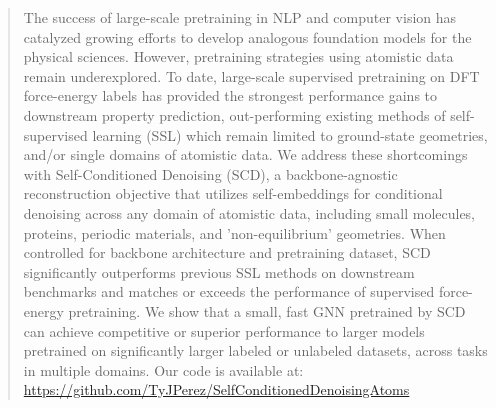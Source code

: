 \documentclass{article}
\theoremstyle{plain}
\theoremstyle{definition}
\theoremstyle{remark}
\begin{document}


\printAffiliationsAndNotice{}  %


\begin{abstract}
  

The success of large-scale pretraining in NLP and computer vision has catalyzed growing efforts to develop analogous foundation models for the physical sciences. However,  pretraining strategies using atomistic data remain underexplored. To date, large-scale supervised pretraining on DFT force-energy labels has provided the strongest performance gains to downstream property prediction, out-performing existing methods of self-supervised learning (SSL) which remain limited to ground-state geometries, and/or single domains of atomistic data. We address these shortcomings with Self-Conditioned Denoising (SCD), a backbone-agnostic reconstruction objective that utilizes self-embeddings for conditional denoising across any domain of atomistic data, including small molecules, proteins, periodic materials, and 'non-equilibrium' geometries. When controlled for backbone architecture and pretraining dataset, SCD significantly outperforms previous SSL methods on downstream benchmarks and matches or exceeds the performance of supervised force-energy pretraining. We show that a small, fast GNN pretrained by SCD can achieve competitive or superior performance to larger models pretrained on significantly larger labeled or unlabeled datasets, across tasks in multiple domains. Our code is available at: \url{https://github.com/TyJPerez/SelfConditionedDenoisingAtoms}

\end{abstract}
\end{document}
